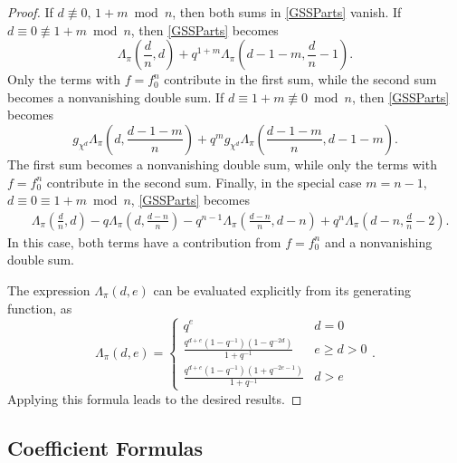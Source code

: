 \documentclass[11pt,letterpaper]{article}
\theoremstyle{definition}
\theoremstyle{remark}
\numberwithin{equation}{section}
\theoremstyle{dotless}
\begin{document}
\begin{proof}
If $d \not \equiv 0, \, 1+m \bmod n$, then both sums in \eqref{GSSParts} vanish. If $d \equiv 0 \not\equiv 1+m \bmod n$, then \eqref{GSSParts} becomes
\begin{equation*}
\Lambda_{\pi}\left(\frac{d}{n}, d\right) + q^{1+m} \Lambda_{\pi}\left(d-1-m, \frac{d}{n}-1\right).
\end{equation*}
Only the terms with $f=f_0^n$ contribute in the first sum, while the second sum becomes a nonvanishing double sum. If $d \equiv 1+m \not \equiv 0 \bmod n$, then \eqref{GSSParts} becomes
\begin{equation*}
g_{\chi^d} \Lambda_{\pi}\left(d, \frac{d-1-m}{n}\right)+q^{m}g_{\chi^d} \Lambda_{\pi}\left(\frac{d-1-m}{n}, d-1-m\right).
\end{equation*}
The first sum becomes a nonvanishing double sum, while only the terms with $f=f_0^n$ contribute in the second sum. Finally, in the special case $m=n-1$, $d \equiv 0 \equiv 1+m \bmod n$, \eqref{GSSParts} becomes
\begin{equation*}
\begin{split}
& \Lambda_{\pi}\left(\frac{d}{n}, d\right) - q\Lambda_{\pi}\left(d, \frac{d-n}{n}\right) -q^{n-1}\Lambda_{\pi}\left(\frac{d-n}{n}, d-n\right)+q^{n}\Lambda_{\pi}\left(d-n, \frac{d}{n}-2\right).
\end{split}
\end{equation*}
In this case, both terms have a contribution from $f=f_0^n$ and a nonvanishing double sum. 

The expression $\Lambda_{\pi}(d,e)$ can be evaluated explicitly from its generating function, as 
\begin{equation*}
\Lambda_{\pi}(d,e) = \left\lbrace \begin{array}{cc} q^e & d=0 \\ \frac{q^{d+e}(1-q^{-1})(1-q^{-2d})}{1+q^{-1}} & e \geq d >0 \\ \frac{q^{d+e}(1-q^{-1})(1+q^{-2e-1})}{1+q^{-1}} & d>e \end{array}\right. .
\end{equation*}
Applying this formula leads to the desired results. 
\end{proof}

\subsection{Coefficient Formulas}
 
\end{document}
